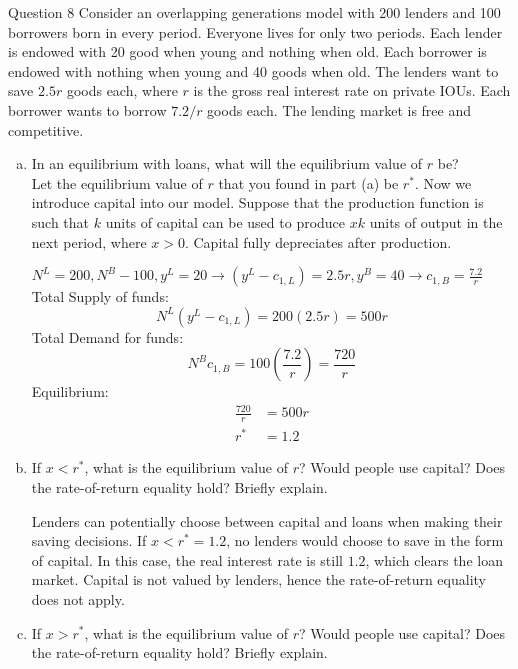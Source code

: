 \documentclass[a4paper]{article}
\newif\IfInSansMode
\numberwithin{equation}{section}
\numberwithin{figure}{section}
\begin{document}
	\begin{questionbox}{Question 8}
		Consider an overlapping generations model with 200 lenders and 100 borrowers born in every period. Everyone lives for only two periods. Each lender is endowed with 20 good when young and nothing when old. Each borrower is endowed with nothing when young and 40 goods when old. The lenders want to save \( 2.5r \) goods each, where \(r\) is the gross real interest rate on private IOUs. Each borrower wants to borrow \( 7.2/r \) goods each. The lending market is free and competitive.
		\begin{enumerate}[(a)]
			\item In an equilibrium with loans, what will the equilibrium value of \(r\) be?\\
			Let the equilibrium value of \( r \) that you found in part (a) be \( r^* \). Now we introduce capital into our model. Suppose that the production function is such that \(k\) units of capital can be used to produce \(xk\) units of output in the next period, where \(x > 0\). Capital fully depreciates after production.
			\begin{explanationbox}
				\( N^L=200, N^B-100, y^L = 20 \rightarrow (y^L-c_{1,L}) = 2.5r, y^B = 40 \rightarrow c_{1,B} = \frac{7.2}{r} \)\\
				Total Supply of funds:
				\[
					N^L(y^L-c_{1,L}) = 200(2.5r) = 500r
				\]
				Total Demand for funds:
				\[
					N^Bc_{1,B} = 100\left(\frac{7.2}{r}\right) = \frac{720}{r}
				\]
				Equilibrium:
				\begin{align*}
					\frac{720}{r} &= 500r\\
					r^*&=1.2
				\end{align*}
			\end{explanationbox}
			\item If \( x<r^* \), what is the equilibrium value of \( r \)? Would people use capital? Does the rate-of-return equality hold? Briefly explain.
			\begin{explanationbox}
				Lenders can potentially choose between capital and loans when making their saving decisions. If \( x < r^* =1.2 \), no lenders would choose to save in the form of capital. In this case, the real interest rate is still \( 1.2 \), which clears the loan market. Capital is not valued by lenders, hence the rate-of-return equality does not apply.
			\end{explanationbox}
			\item If \( x>r^* \), what is the equilibrium value of \( r \)? Would people use capital? Does the rate-of-return equality hold? Briefly explain.

\end{enumerate}
\end{questionbox}
\end{document}
